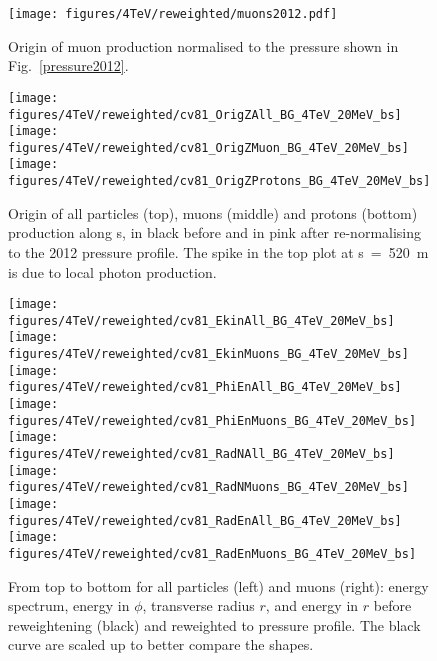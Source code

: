 \begin{figure}%
\begin{center}
  \texttt{[image: figures/4TeV/reweighted/muons2012.pdf]}
\end{center}
\vspace{-0.6cm}
 \caption{Origin of muon production normalised to the pressure shown in Fig.~\ref{pressure2012}. 
  \label{normed}}
\end{figure}


\begin{figure}
\begin{center}
  \texttt{[image: figures/4TeV/reweighted/cv81\_OrigZAll\_BG\_4TeV\_20MeV\_bs]}
  \texttt{[image: figures/4TeV/reweighted/cv81\_OrigZMuon\_BG\_4TeV\_20MeV\_bs]}
  \texttt{[image: figures/4TeV/reweighted/cv81\_OrigZProtons\_BG\_4TeV\_20MeV\_bs]}
\end{center}
\vspace{-0.6cm}
 \caption{Origin of all particles (top), muons (middle) and protons (bottom) production along s, in black before and in pink after re-normalising to the 2012 pressure profile. The spike in the top plot at s~=~520~m is due to local photon production.
  \label{fig:OrigZ4TeV}}
\end{figure}

\begin{figure}
\begin{center}
  \texttt{[image: figures/4TeV/reweighted/cv81\_EkinAll\_BG\_4TeV\_20MeV\_bs]}
  \texttt{[image: figures/4TeV/reweighted/cv81\_EkinMuons\_BG\_4TeV\_20MeV\_bs]}
  \texttt{[image: figures/4TeV/reweighted/cv81\_PhiEnAll\_BG\_4TeV\_20MeV\_bs]}
  \texttt{[image: figures/4TeV/reweighted/cv81\_PhiEnMuons\_BG\_4TeV\_20MeV\_bs]}
  \texttt{[image: figures/4TeV/reweighted/cv81\_RadNAll\_BG\_4TeV\_20MeV\_bs]}
  \texttt{[image: figures/4TeV/reweighted/cv81\_RadNMuons\_BG\_4TeV\_20MeV\_bs]}
  \texttt{[image: figures/4TeV/reweighted/cv81\_RadEnAll\_BG\_4TeV\_20MeV\_bs]}
  \texttt{[image: figures/4TeV/reweighted/cv81\_RadEnMuons\_BG\_4TeV\_20MeV\_bs]}
\end{center}
\vspace{-0.6cm}
 \caption{From top to bottom for all particles (left) and muons (right): energy spectrum, energy in $\phi$, transverse radius $r$, and energy in $r$ before reweightening (black) and reweighted to pressure profile. The black curve are scaled up to better compare the shapes. 
  \label{fig:cv81EkinPhiEn4TeV}} 
\end{figure}


